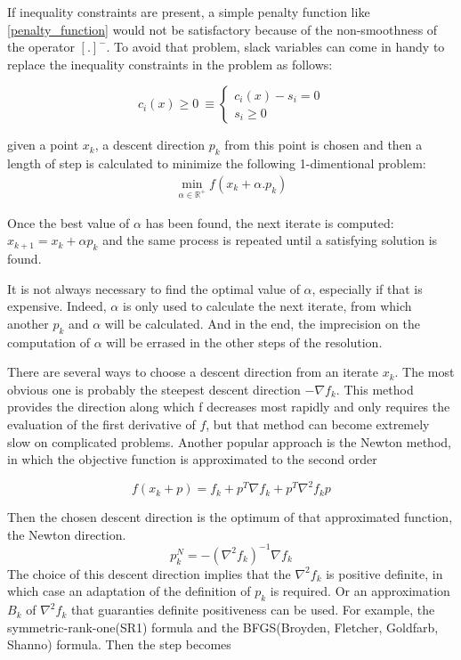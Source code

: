 If inequality constraints are present, a simple penalty function like \ref{penalty_function} would not be satisfactory because of the non-smoothness of the operator $[.]^-$.
To avoid that problem, slack variables can come in handy to replace the inequality constraints in the problem as follows:

\begin{equation}
  c_i(x)\geq 0\ \equiv
  \left\{
  \begin{array}{l}
    c_i(x)-s_i=0\\
    s_i\geq 0
  \end{array}
  \right.
\end{equation}


given a point $x_k$, a descent direction $p_k$ from this
point is chosen and then a length of step is calculated to minimize the
following 1-dimentional problem:
\begin{align}
  \min_{\alpha \in \mathbb{R}^+} f(x_k + \alpha.p_k)
\label{eq:lineSearch}
\end{align}

Once the best value of $\alpha$ has been found, the next iterate is computed:
$x_{k+1} = x_{k} + \alpha p_k$ and the same process is repeated until a
satisfying solution is found.

It is not always necessary to find the optimal value of $\alpha$, especially if
that is expensive. Indeed, $\alpha$ is only used to calculate the next iterate,
from which another $p_k$ and $\alpha$ will be calculated. And in the end, the
imprecision on the computation of $\alpha$ will be errased in the other steps of
the resolution.

There are several ways to choose a descent direction from an iterate $x_k$. The
most obvious one is probably the steepest descent direction $-\nabla f_k$. This
method provides the direction along which f decreases most rapidly and only
requires the evaluation of the first derivative of $f$, but that method can
become extremely slow on complicated problems. Another popular approach is the
Newton method, in which the objective function is approximated to the second
order

\begin{equation}
  f(x_k+p) = f_k + p^T\nabla f_k + p^T\nabla^2f_k p
\end{equation}

Then the chosen descent direction is the optimum of that approximated function,
the Newton direction.
\begin{equation}
  p^N_k = -(\nabla^2 f_k)^{-1} \nabla f_k
\end{equation}
The choice of this descent direction implies that the $\nabla^2f_k$ is positive
definite, in which case an adaptation of the definition of $p_k$ is required. Or
an approximation $B_k$ of $\nabla^2f_k$ that guaranties definite positiveness can be
used. For example, the symmetric-rank-one(SR1) formula and the BFGS(Broyden,
Fletcher, Goldfarb, Shanno) formula. Then the step becomes

